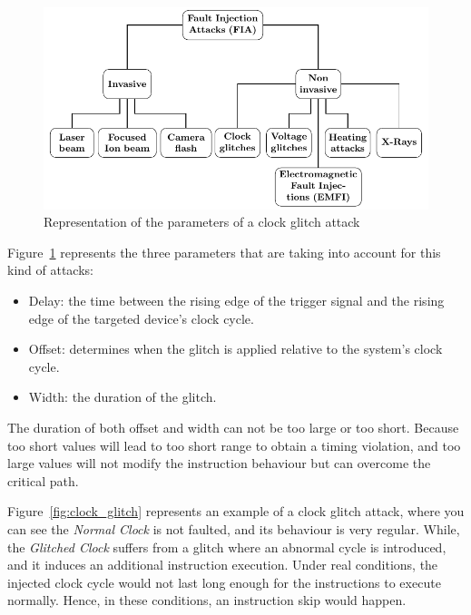 \begin{figure}[ht]
    \centering
    \includegraphics[page=5]{c2_soa/img/physicalAttacks.pdf}
    \caption{Representation of the parameters of a clock glitch attack}
    \label{fig:clock_glitch_parameters}
\end{figure}

Figure~\ref{fig:clock_glitch_parameters} represents the three parameters that are taking into account for this kind of attacks:
\begin{itemize}
    \item Delay: the time between the rising edge of the trigger signal and the rising edge of the targeted device's clock cycle.
    \item Offset: determines when the glitch is applied relative to the system's clock cycle.
    \item Width: the duration of the glitch.
\end{itemize}

The duration of both offset and width can not be too large or too short. Because too short values will lead to too short range to obtain a timing violation, and too large values will not modify the instruction behaviour but can overcome the critical path.

Figure~\ref{fig:clock_glitch} represents an example of a clock glitch attack, where you can see the \textit{Normal Clock} is not faulted, and its behaviour is very regular. While, the \textit{Glitched Clock} suffers from a glitch where an abnormal cycle is introduced, and it induces an additional instruction execution. Under real conditions, the injected clock cycle would not last long enough for the instructions to execute normally. Hence, in these conditions, an instruction skip would happen.

